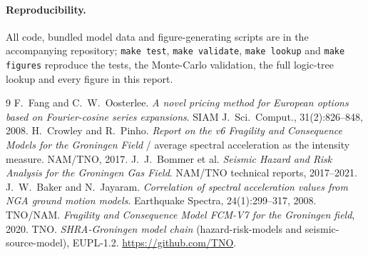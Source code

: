 \documentclass[11pt,a4paper]{article}
\begin{document}
\paragraph{Reproducibility.} All code, bundled model data and figure-generating
scripts are in the accompanying repository; \texttt{make test},
\texttt{make validate}, \texttt{make lookup} and \texttt{make figures} reproduce
the tests, the Monte-Carlo validation, the full logic-tree lookup and every
figure in this report.

\begin{thebibliography}{9}
 F.~Fang and C.~W.~Oosterlee.
  \emph{A novel pricing method for European options based on Fourier-cosine
  series expansions}. SIAM J.\ Sci.\ Comput., 31(2):826--848, 2008.
 H.~Crowley and R.~Pinho.
  \emph{Report on the v6 Fragility and Consequence Models for the Groningen Field}
  / average spectral acceleration as the intensity measure. NAM/TNO, 2017.
 J.~J.~Bommer et al.
  \emph{Seismic Hazard and Risk Analysis for the Groningen Gas Field}.
  NAM/TNO technical reports, 2017--2021.
 J.~W.~Baker and N.~Jayaram.
  \emph{Correlation of spectral acceleration values from NGA ground motion
  models}. Earthquake Spectra, 24(1):299--317, 2008.
 TNO/NAM.
  \emph{Fragility and Consequence Model FCM-V7 for the Groningen field}, 2020.
 TNO.
  \emph{SHRA-Groningen model chain} (hazard-risk-models and seismic-source-model),
  EUPL-1.2. \url{https://github.com/TNO}.
\end{thebibliography}
\end{document}
